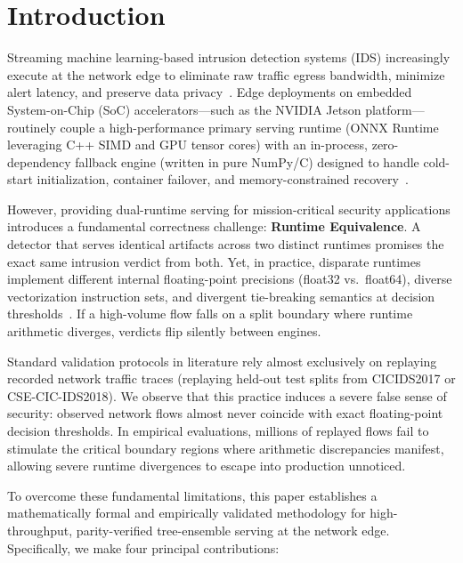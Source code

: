\section{Introduction}
\label{sec:introduction}

Streaming machine learning-based intrusion detection systems (IDS) increasingly execute at the network edge to eliminate raw traffic egress bandwidth, minimize alert latency, and preserve data privacy~\cite{sforzin2016rpids,baalaji2025ensemble}. Edge deployments on embedded System-on-Chip (SoC) accelerators---such as the NVIDIA Jetson platform---routinely couple a high-performance primary serving runtime (\eg ONNX Runtime leveraging C++ SIMD and GPU tensor cores) with an in-process, zero-dependency fallback engine (\eg written in pure NumPy/C) designed to handle cold-start initialization, container failover, and memory-constrained recovery~\cite{asghar2026hedid,hasan2025iiot}.

However, providing dual-runtime serving for mission-critical security applications introduces a fundamental correctness challenge: \textbf{Runtime Equivalence}. A detector that serves identical artifacts across two distinct runtimes promises the exact same intrusion verdict from both. Yet, in practice, disparate runtimes implement different internal floating-point precisions (\eg float32 vs.\ float64), diverse vectorization instruction sets, and divergent tie-breaking semantics at decision thresholds~\cite{jajal2024onnxconverters,wen2025mindthegap}. If a high-volume flow falls on a split boundary where runtime arithmetic diverges, verdicts flip silently between engines.

Standard validation protocols in literature rely almost exclusively on replaying recorded network traffic traces (\eg replaying held-out test splits from CICIDS2017 or CSE-CIC-IDS2018). We observe that this practice induces a severe false sense of security: observed network flows almost never coincide with exact floating-point decision thresholds. In empirical evaluations, millions of replayed flows fail to stimulate the critical boundary regions where arithmetic discrepancies manifest, allowing severe runtime divergences to escape into production unnoticed.

To overcome these fundamental limitations, this paper establishes a mathematically formal and empirically validated methodology for high-throughput, parity-verified tree-ensemble serving at the network edge. Specifically, we make four principal contributions:

